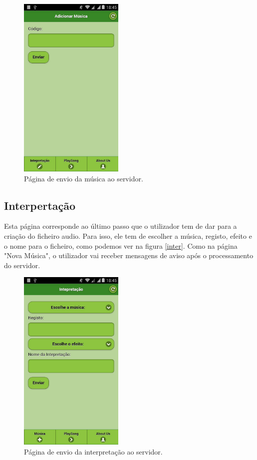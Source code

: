 \begin{figure}[htp]
\centering
\includegraphics[width=50mm]{images/appAddNote.jpg}
\caption{Página de envio da música ao servidor.}
\label{music}
\end{figure}

\subsection{Interpertação}
Esta página corresponde ao último passo que o utilizador tem de dar para a criação do ficheiro audio. Para isso, ele tem de escolher a música, registo, efeito e o nome para o ficheiro, como podemos ver na figura \autoref{inter}. Como na página "Nova Música", o utilizador vai receber mensagens de aviso após o processamento do servidor.

\begin{figure}[htp]
\centering
\includegraphics[width=50mm]{images/appAddMusic.jpg}
\caption{Página de envio da interpretação ao servidor.}
\label{inter}
\end{figure}

